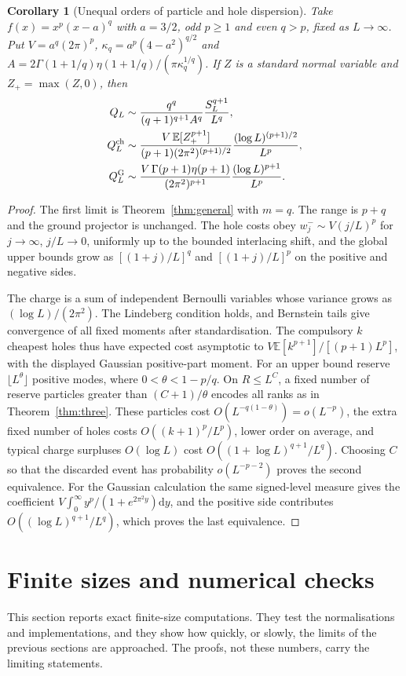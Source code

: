 \documentclass[11pt,a4paper]{article}
\newtheorem{corollary}[theorem]{Corollary}
\theoremstyle{remark}
\newcommand{\E}{\mathbb E}
\newcommand{\dd}{\mathrm d}
\begin{document}
\begin{corollary}[Unequal orders of particle and hole dispersion]\label{cor:pq}
Take $f(x)=x^p(x-a)^q$ with $a=3/2$, odd $p\ge1$ and even $q>p$, fixed as $L\to\infty$. Put $V=a^q(2\pi)^p$, $\kappa_q=a^p(4-a^2)^{q/2}$ and $A=2\Gamma(1+1/q)\eta(1+1/q)/(\pi\kappa_q^{1/q})$. If $Z$ is a standard normal variable and $Z_+=\max(Z,0)$, then
\begin{align*}
 Q_L&\sim \frac{q^q}{(q+1)^{q+1}A^q}\frac{S_L^{q+1}}{L^q},\\
 Q_L^{\rm ch}&\sim
 \frac{V\,\E[Z_+^{p+1}]}{(p+1)(2\pi^2)^{(p+1)/2}}
 \frac{(\log L)^{(p+1)/2}}{L^p},\\
 Q_L^{\rm G}&\sim\frac{V\,\Gamma(p+1)\eta(p+1)}{(2\pi^2)^{p+1}}
                    \frac{(\log L)^{p+1}}{L^p}.
\end{align*}
\end{corollary}
\begin{proof}
The first limit is Theorem~\ref{thm:general} with $m=q$. The range is $p+q$ and the ground projector is unchanged. The hole costs obey $w_j^-\sim V(j/L)^p$ for $j\to\infty$, $j/L\to0$, uniformly up to the bounded interlacing shift, and the global upper bounds grow as $[(1+j)/L]^q$ and $[(1+j)/L]^p$ on the positive and negative sides.

The charge is a sum of independent Bernoulli variables whose variance grows as $(\log L)/(2\pi^2)$. The Lindeberg condition holds, and Bernstein tails give convergence of all fixed moments after standardisation. The compulsory $k$ cheapest holes thus have expected cost asymptotic to $V\E[k^{p+1}]/[(p+1)L^p]$, with the displayed Gaussian positive-part moment. For an upper bound reserve $\lfloor L^\theta\rfloor$ positive modes, where $0<\theta<1-p/q$. On $R\le L^C$, a fixed number of reserve particles greater than $(C+1)/\theta$ encodes all ranks as in Theorem~\ref{thm:three}. These particles cost $O(L^{-q(1-\theta)})=o(L^{-p})$, the extra fixed number of holes costs $O((k+1)^p/L^p)$, lower order on average, and typical charge surpluses $O(\log L)$ cost $O((1+\log L)^{q+1}/L^q)$. Choosing $C$ so that the discarded event has probability $o(L^{-p-2})$ proves the second equivalence. For the Gaussian calculation the same signed-level measure gives the coefficient $V\int_0^\infty y^p/(1+e^{2\pi^2 y})\dd y$, and the positive side contributes $O((\log L)^{q+1}/L^q)$, which proves the last equivalence.
\end{proof}

\section{Finite sizes and numerical checks}\label{sec:numerics}
This section reports exact finite-size computations. They test the normalisations and implementations, and they show how quickly, or slowly, the limits of the previous sections are approached. The proofs, not these numbers, carry the limiting statements.
\end{document}
